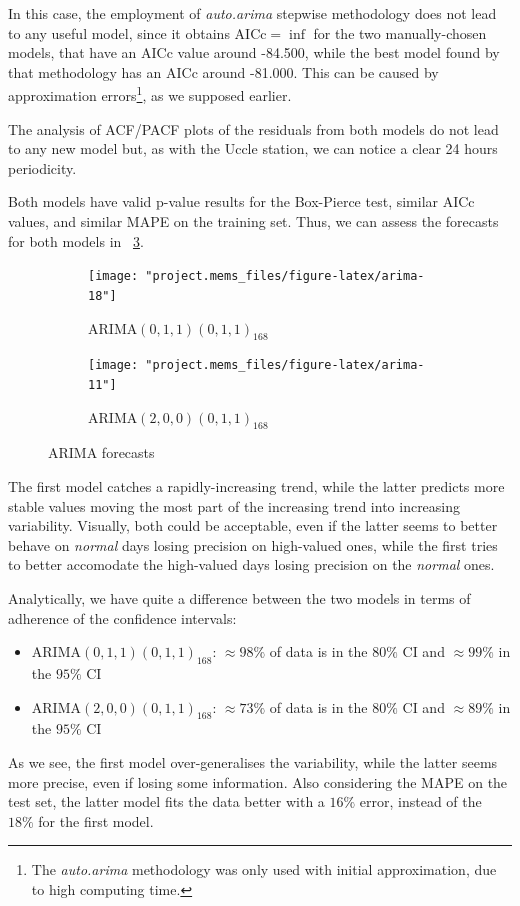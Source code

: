 \documentclass[12pt]{article}
\begin{document}
In this case, the employment of \textit{auto.arima} stepwise methodology does not lead to any useful model, since it obtains $\mathrm{AICc}=\inf$ for the two manually-chosen models, that have an AICc value around -84.500, while the best model found by that methodology has an AICc around -81.000. This can be caused by approximation errors\footnote{The \textit{auto.arima} methodology was only used with initial approximation, due to high computing time.}, as we supposed earlier.

The analysis of ACF/PACF plots of the residuals from both models do not lead to any new model but, as with the Uccle station, we can notice a clear 24 hours periodicity.

Both models have valid p-value results for the Box-Pierce test, similar AICc values, and similar MAPE on the training set. Thus, we can assess the forecasts for both models in \figurename~\ref{fig:mems:arima}.

\begin{figure}[h]
	\begin{subfigure}{.5\linewidth}
		\texttt{[image: "project.mems\_files/figure-latex/arima-18"]} %
		\caption{$\mathrm{ARIMA}(0,1,1)(0,1,1)_{168}$}
		\label{fig:mems:arima:011011}
	\end{subfigure}
	\begin{subfigure}{.5\linewidth}
		\texttt{[image: "project.mems\_files/figure-latex/arima-11"]} %
		\caption{$\mathrm{ARIMA}(2,0,0)(0,1,1)_{168}$}
		\label{fig:mems:arima:200011}
	\end{subfigure}
	\begin{center}
		\caption{ARIMA forecasts}
		\label{fig:mems:arima}
	\end{center}
\end{figure}

The first model catches a rapidly-increasing trend, while the latter predicts more stable values moving the most part of the increasing trend into increasing variability. Visually, both could be acceptable, even if the latter seems to better behave on \textit{normal} days losing precision on high-valued ones, while the first tries to better accomodate the high-valued days losing precision on the \textit{normal} ones.

Analytically, we have quite a difference between the two models in terms of adherence of the confidence intervals:
\begin{itemize}[topsep=0.5em,itemsep=0em,partopsep=0.5em]
	\item $\mathrm{ARIMA}(0,1,1)(0,1,1)_{168}$: $\approx98\%$ of data is in the $80\%$ CI and $\approx99\%$ in the $95\%$ CI
	\item $\mathrm{ARIMA}(2,0,0)(0,1,1)_{168}$: $\approx73\%$ of data is in the $80\%$ CI and $\approx89\%$ in the $95\%$ CI
\end{itemize}
As we see, the first model over-generalises the variability, while the latter seems more precise, even if losing some information. Also considering the MAPE on the test set, the latter model fits the data better with a $16\%$ error, instead of the $18\%$ for the first model.
\end{document}
